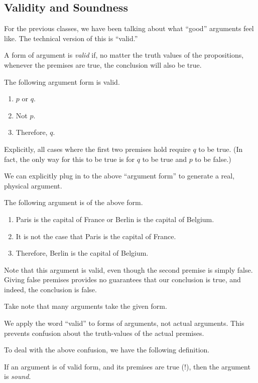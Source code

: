\subsection{Validity and Soundness}
For the previous classes, we have been talking about what ``good'' arguments feel like. The technical version of this is ``valid.''
\begin{definition}[Valid]
	A form of argument is \textit{valid} if, no matter the truth values of the propositions, whenever the premises are true, the conclusion will also be true.
\end{definition}
\begin{example}
	The following argument form is valid.
	\begin{enumerate}
		\item $p$ or $q$.
		\item Not $p$.
		\item Therefore, $q$.
	\end{enumerate}
	Explicitly, all cases where the first two premises hold require $q$ to be true. (In fact, the only way for this to be true is for $q$ to be true and $p$ to be false.)
\end{example}
We can explicitly plug in to the above ``argument form'' to generate a real, physical argument.
\begin{example}
	The following argument is of the above form.
	\begin{enumerate}
		\item Paris is the capital of France or Berlin is the capital of Belgium.
		\item It is not the case that Paris is the capital of France.
		\item Therefore, Berlin is the capital of Belgium.
	\end{enumerate}
	Note that this argument is valid, even though the second premise is simply false. Giving false premises provides no guarantees that our conclusion is true, and indeed, the conclusion is false.
\end{example}
Take note that many arguments take the given form.
\begin{warn}
	We apply the word ``valid'' to forms of arguments, not actual arguments. This prevents confusion about the truth-values of the actual premises.
\end{warn}
To deal with the above confusion, we have the following definition.
\begin{definition}[Sound]
	If an argument is of valid form, and its premises are true (!), then the argument is \textit{sound}.
\end{definition}
